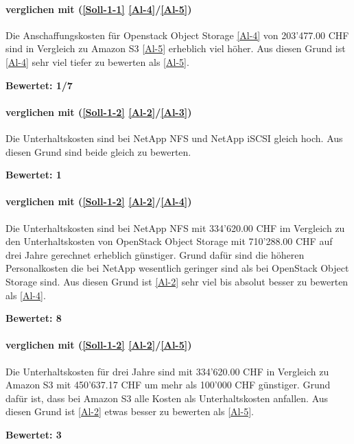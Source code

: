 \paragraph*{  verglichen mit  (\ref{Soll-1-1} \ref{Al-4}/\ref{Al-5})}
Die Anschaffungskosten für Openstack Object Storage \ref{Al-4} von 203'477.00 CHF sind in Vergleich zu Amazon S3 \ref{Al-5} erheblich viel höher.
Aus diesen Grund ist \ref{Al-4} sehr viel tiefer zu bewerten als \ref{Al-5}.

\textbf{Bewertet: 1/7}

\paragraph*{  verglichen mit  (\ref{Soll-1-2} \ref{Al-2}/\ref{Al-3})}
Die Unterhaltskosten sind bei NetApp NFS und NetApp iSCSI gleich hoch. Aus diesen Grund sind beide gleich zu bewerten.

\textbf{Bewertet: 1}

\paragraph*{  verglichen mit  (\ref{Soll-1-2} \ref{Al-2}/\ref{Al-4})}
Die Unterhaltskosten sind bei NetApp NFS mit 334'620.00 CHF im Vergleich zu den Unterhaltskosten von OpenStack Object Storage mit 710'288.00 CHF auf drei Jahre gerechnet erheblich günstiger. Grund dafür sind die höheren Personalkosten die bei NetApp wesentlich geringer sind als bei OpenStack Object Storage sind. Aus diesen Grund ist  \ref{Al-2} sehr viel bis absolut besser zu bewerten als  \ref{Al-4}.

\textbf{Bewertet: 8}

\paragraph*{  verglichen mit  (\ref{Soll-1-2} \ref{Al-2}/\ref{Al-5})}
Die Unterhaltskosten für drei Jahre sind mit 334'620.00 CHF in Vergleich zu Amazon S3 mit 450'637.17 CHF um mehr als 100'000 CHF günstiger. Grund dafür ist, dass bei Amazon S3 alle Kosten als Unterhaltskosten anfallen.
Aus diesen Grund ist  \ref{Al-2} etwas besser zu bewerten als  \ref{Al-5}.

\textbf{Bewertet: 3}

